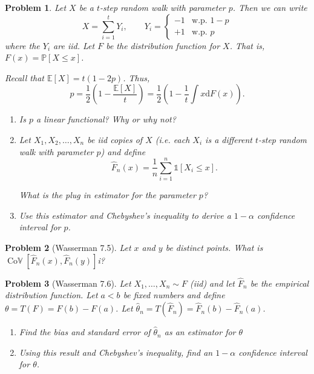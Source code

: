 \documentclass{article}
\newtheorem{problem}{Problem}
\renewcommand{\d}{\mathrm{d}}
\newcommand{\PP}{\mathbb{P}}
\newcommand{\EE}{\mathbb{E}}
\newcommand{\CoV}{\operatorname{Co\mathbb{V}}}
\newcommand{\bOne}{\mathds{1}}
\begin{document}
\begin{problem}
Let $X$ be a $t$-step random walk with parameter $p$. Then we can write 
\begin{equation*}
    X = \sum_{i=1}^{t} Y_i
    ,\qquad
    Y_i = \begin{cases} -1 & \text{w.p. } 1-p \\ +1 & \text{w.p. } p \end{cases}
\end{equation*}
where the $Y_i$ are iid.
Let $F$ be the distribution function for $X$. That is, $F(x) = \PP[X\leq x]$.

Recall that $\EE[X] = t(1-2p)$.
Thus,
\begin{equation*}
    p 
    = \frac{1}{2} \left(1-\frac{\EE[X]}{t} \right)
    = \frac{1}{2} \left(1 - \frac{1}{t} \int x \d{F}(x) \right).
\end{equation*}

    \begin{enumerate}[label=(\alph*),topsep=0pt]

        \item Is $p$ a linear functional? Why or why not?
        \item Let $X_1, X_2, \ldots, X_n$ be iid copies of $X$ (i.e. each $X_i$ is a different $t$-step random walk with parameter $p$) and define
            \begin{equation*}
                \hat{F}_n(x) = \frac{1}{n} \sum_{i=1}^{n} \bOne[X_i \leq x].
            \end{equation*}

            What is the plug in estimator for the parameter $p$?
        \item Use this estimator and Chebyshev's inequality to derive a $1-\alpha$ confidence interval for $p$. 
    \end{enumerate}
\end{problem}

\begin{problem}[Wasserman 7.5]
    Let $x$ and $y$ be distinct points. What is $\CoV[\hat{F}_n(x), \hat{F}_n(y)]$i?
\end{problem}

\begin{problem}[Wasserman 7.6]
Let $X_1, \ldots, X_n \sim F$ (iid) and let $\hat{F}_n$ be the empirical distribution function.
Let $a<b$ be fixed numbers and define $\theta = T(F) = F(b) - F(a)$.
    Let $\hat{\theta}_n = T(\hat{F}_n) = \hat{F}_n(b) - \hat{F}_n(a)$.
    \begin{enumerate}[label=(\alph*),topsep=0pt]
        \item Find the bias and standard error of $\hat{\theta}_n$ as an estimator for $\theta$
        \item Using this result and Chebyshev's inequality, find an $1-\alpha$ confidence interval for $\theta$.
    \end{enumerate}
\end{problem}
\clearpage
\end{document}
